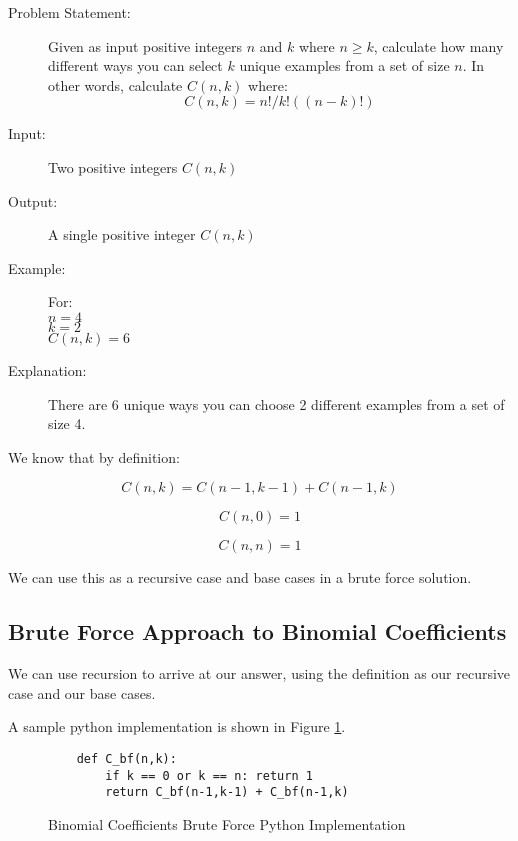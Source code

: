 \begin{description}
    \item[Problem Statement:]
        Given as input positive integers $n$ and $k$ where $n \geq k$, calculate how many different ways you can select $k$ unique examples from a set of size $n$.
        In other words, calculate $C(n,k)$ where: $$C(n,k) = n! / k! ((n-k)!)$$

    \item[Input:] 
        Two positive integers $C(n,k)$
        
    \item[Output:]
        A single positive integer $C(n,k)$
        
    \item[Example:] For:\\
        $n = 4$\\
        $k = 2$\\
        $C(n,k) = 6$

    \item[Explanation:]
        There are 6 unique ways you can choose 2 different examples from a set of size 4.
        
\end{description}

We know that by definition:

$$C(n,k) = C(n-1,k-1) + C(n-1,k)$$

$$C(n,0) = 1$$

$$C(n,n) = 1$$

We can use this as a recursive case and base cases in a brute force solution.

\subsection{Brute Force Approach to Binomial Coefficients}
We can use recursion to arrive at our answer, using the definition as our recursive case and our base cases.

A sample python implementation is shown in Figure \ref{fig:binomial-bf}.

\begin{figure}[H]
    \centering
    \begin{lstlisting}
    def C_bf(n,k):
        if k == 0 or k == n: return 1
        return C_bf(n-1,k-1) + C_bf(n-1,k)
    \end{lstlisting}
    \caption{Binomial Coefficients Brute Force Python Implementation}
    \label{fig:binomial-bf}
\end{figure}

